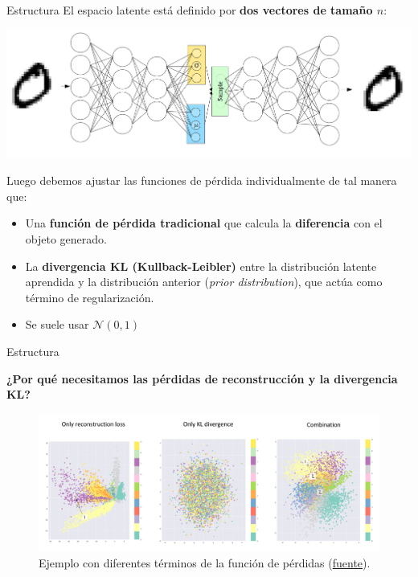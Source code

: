 \begin{frame}{Estructura}
El espacio latente está definido por \textbf{dos vectores de tamaño $n$}:

\begin{center}
\includegraphics[width=.8\textwidth]{Slides/figures/02_Metodos_Generativos/nn-vae.png}
\end{center}

Luego debemos ajustar las funciones de pérdida individualmente de tal manera que:

\begin{itemize}
    \item Una \textbf{función de pérdida tradicional} que calcula la \textbf{diferencia} con el objeto generado.
    \item La \textbf{divergencia KL (Kullback-Leibler)} entre la distribución latente aprendida y la distribución anterior (\textit{prior distribution}), que actúa como término de regularización. 
    \item Se suele usar $\mathcal{N}(0, 1)$
\end{itemize}
\end{frame}

\begin{frame}{Estructura}

\textbf{¿Por qué necesitamos las pérdidas de reconstrucción y la divergencia KL?}


\begin{figure}
    \centering
    \includegraphics[width=1\textwidth]{Slides/figures/02_Metodos_Generativos/vae-comparison-mse-and-kl.png}
    \caption{Ejemplo con diferentes términos de la función de pérdidas (\href{https://www.jeremyjordan.me/content/images/2018/03/Screen-Shot-2018-03-18-at-7.22.24-PM.png}{fuente}).}
    \label{fig:enter-label}
\end{figure}

\end{frame}

